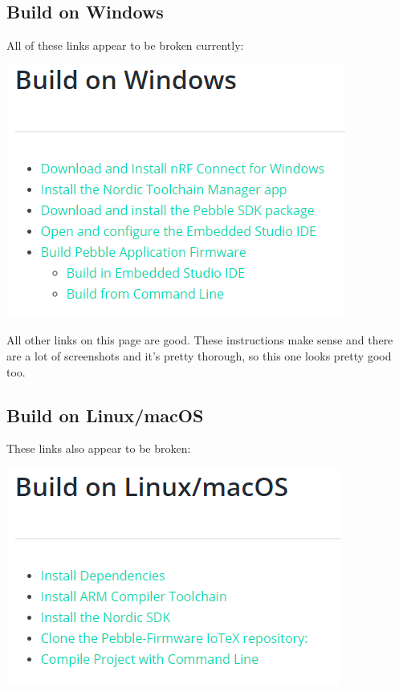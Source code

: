 \documentclass[
]{book}
\begin{document}
\hypertarget{build-on-windows}{%
\subsection{Build on Windows}\label{build-on-windows}}

All of these links appear to be broken currently:

\includegraphics{images/build_windows_broken_links.PNG}

All other links on this page are good. These instructions make sense and
there are a lot of screenshots and it's pretty thorough, so this one
looks pretty good too.

\hypertarget{build-on-linuxmacos}{%
\subsection{Build on Linux/macOS}\label{build-on-linuxmacos}}

These links also appear to be broken:

\includegraphics{images/build_linux_broken_links.PNG}
\end{document}
